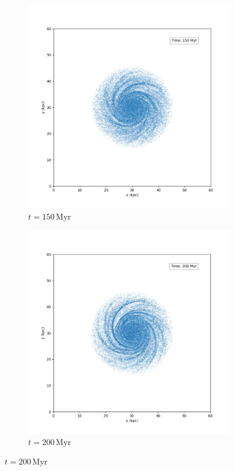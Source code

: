 \begin{figure}[htp]
    \vspace{0.2cm}

    \begin{subfigure}[b]{0.45\textwidth}
        \centering
        \includegraphics[width=\textwidth]{chapters/results/img/p3m-galaxy/150myr.png}
        \caption{$t=150\,\text{Myr}$}
        \label{fig:spiral-galaxy-evolution-p3m-sub3}
    \end{subfigure}
    \hfill
    \begin{subfigure}[b]{0.45\textwidth}
        \centering
        \includegraphics[width=\textwidth]{chapters/results/img/p3m-galaxy/200myr.png}
        \caption{$t=200\,\text{Myr}$}
        \label{fig:spiral-galaxy-evolution-p3m-sub4}
    \end{subfigure}


\end{figure}
